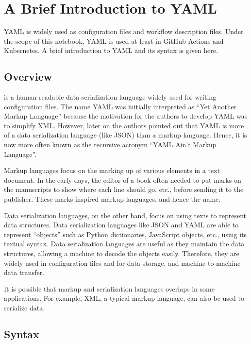 \chapter{A Brief Introduction to YAML} \label{ch:yaml}

YAML is widely used as configuration files and workflow description files. Under the scope of this notebook, YAML is used at least in GitHub Actions and Kubernetes. A brief introduction to YAML and its syntax is given here.

\section{Overview}

 is a human-readable data serialization language widely used for writing configuration files. The name YAML was initially interpreted as ``Yet Another Markup Language'' because the motivation for the authors to develop YAML was to simplify XML. However, later on the authors pointed out that YAML is more of a data serialization language (like JSON) than a markup language. Hence, it is now more often known as the recursive acronym ``YAML Ain't Markup Language''.

\begin{mdframed}

Markup languages focus on the marking up of various elements in a text document. In the early days, the editor of a book often needed to put marks on the manuscripts to show where each line should go, etc., before sending it to the publisher. These marks inspired markup languages, and hence the name.

Data serialization languages, on the other hand, focus on using texts to represent data structures. Data serialization languages like JSON and YAML are able to represent ``objects'' such as Python dictionaries, JavaScript objects, etc., using its textual syntax. Data serialization languages are useful as they maintain the data structures, allowing a machine to decode the objects easily. Therefore, they are widely used in configuration files and for data storage, and machine-to-machine data transfer.

It is possible that markup and serialization languages overlaps in some applications. For example, XML, a typical markup language, can also be used to serialize data.

\end{mdframed}

\section{Syntax}

